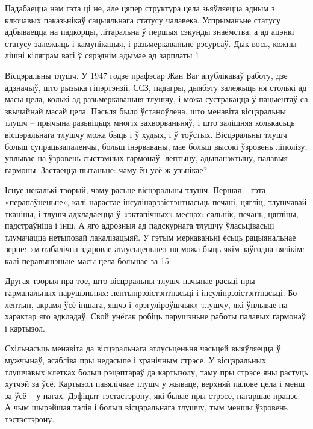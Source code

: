 Падабаецца нам гэта ці не, але цяпер структура цела зьяўляецца адным з ключавых паказьнікаў сацыяльнага статусу чалавека. Успрыманьне статусу адбываецца на падкорцы, літаральна ў першыя сэкунды знаёмства, а ад ацэнкі статусу залежыць і камунікацыя, і разьмеркаваньне рэсурсаў. Дык вось, кожны лішні кіляграм вагі ў сярэднім адымае ад зарплаты 1%

Вісцэральны тлушч. У 1947 годзе прафэсар Жан Ваг апублікаваў работу, дзе адзначыў, што рызыка гіпэртэнзіі, ССЗ, падагры, дыябэту залежыць ня столькі ад масы цела, колькі ад разьмеркаваньня тлушчу, і можа сустракацца ў пацыентаў са звычайнай масай цела. Пасьля было ўстаноўлена, што менавіта вісцэральны тлушч – прычына разьвіцьця многіх захворваньняў, і што залішняя колькасьць вісцэральнага тлушчу можа быць і ў худых, і ў тоўстых. Вісцэральны тлушч больш супрацьзапаленчы, больш інэрваваны, мае больш высокі ўзровень ліполізу, уплывае на ўзровень сыстэмных гармонаў: лептыну, адыпанэктыну, палавыя гармоны. Застаецца пытаньне: чаму ён усё ж узьнікае?

Існуе некалькі тэорый, чаму расьце вісцэральны тлушч. Першая – гэта «перапаўненьне», калі нарастае інсулінарэзістэнтнасьць печані, цягліц, тлушчавай тканіны, і тлушч адкладаецца ў «эктапічных» месцах: сальнік, печань, цягліцы, падстраўніца і інш. А яго адрозныя ад падскурнага тлушчу ўласьцівасьці тлумачацца нетыповай лакалізацыяй. У гэтым меркаваньні ёсьць рацыянальнае зерне: «мэтабалічна здаровае атлусьценьне» ня можа быць якім заўгодна вялікім: калі перавышэньне масы цела большае за 15%

Другая тэорыя пра тое, што вісцэральны тлушч пачынае расьці пры гарманальных парушэньнях: лептынрэзістэнтнасьці і інсулінрэзістэнтнасьці. Бо лептын, акрамя ўсё іншага, яшчэ і «рэгуліроўшчык» тлушчу, які ўплывае на характар яго адкладаў. Свой унёсак робіць парушэньне работы палавых гармонаў і картызол.

Схільнасьць менавіта да вісцэральнага атлусьценьня часьцей выяўляецца ў мужчынаў, асабліва пры недасыпе і хранічным стрэсе. У вісцэральных тлушчавых клетках больш рэцэптараў да картызолу, таму пры стрэсе яны растуць хутчэй за ўсё. Картызол павялічвае тлушч у жываце, верхняй палове цела і менш за ўсё – у нагах. Дэфіцыт тэстастэрону, які бывае пры стрэсе, пагаршае працэс. А чым шырэйшая талія і больш вісцэральнага тлушчу, тым меншы ўзровень тэстэстэрону.

